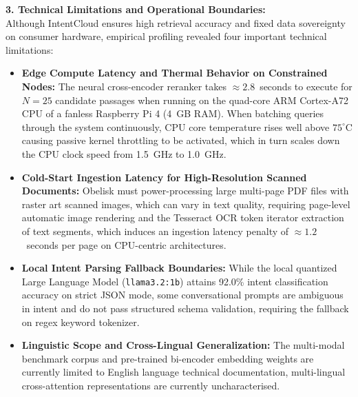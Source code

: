 \documentclass[a4paper,12pt]{article}
\begin{document}
\noindent\textbf{3. Technical Limitations and Operational Boundaries:}\\
Although IntentCloud ensures high retrieval accuracy and fixed data sovereignty on consumer hardware, empirical profiling revealed four important technical limitations: 
\begin{itemize}
    \setlength{\itemsep}{2pt}
    \setlength{\parskip}{0pt}
    \item \textbf{Edge Compute Latency and Thermal Behavior on Constrained Nodes:} The neural cross-encoder reranker takes $\approx 2.8$~seconds to execute for $N=25$ candidate passages when running on the quad-core ARM Cortex-A72 CPU of a fanless Raspberry Pi 4 (4~GB RAM). When batching queries through the system continuously, CPU core temperature rises well above $75^\circ\text{C}$ causing passive kernel throttling to be activated, which in turn scales down the CPU clock speed from 1.5~GHz to 1.0~GHz.
    \item \textbf{Cold-Start Ingestion Latency for High-Resolution Scanned Documents:} Obelisk must power-processing large multi-page PDF files with raster art scanned images, which can vary in text quality, requiring page-level automatic image rendering and the Tesseract OCR token iterator extraction of text segments, which induces an ingestion latency penalty of $\approx 1.2$~seconds per page on CPU-centric architectures.
    \item \textbf{Local Intent Parsing Fallback Boundaries:} While the local quantized Large Language Model (\texttt{llama3.2:1b}) attains 92.0\% intent classification accuracy on strict JSON mode, some conversational prompts are ambiguous in intent and do not pass structured schema validation, requiring the fallback on regex keyword tokenizer.
    \item \textbf{Linguistic Scope and Cross-Lingual Generalization:} The multi-modal benchmark corpus and pre-trained bi-encoder embedding weights are currently limited to English language technical documentation, multi-lingual cross-attention representations are currently uncharacterised. 
\end{itemize}
\end{document}
